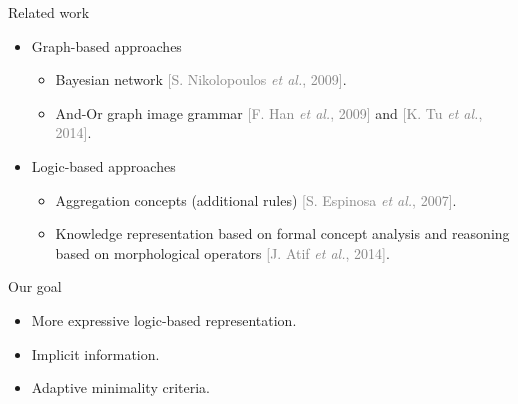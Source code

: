 \documentclass{beamer}
\begin{document}
\begin{frame}{Related work}

 \begin{itemize}
  \item Graph-based approaches
  \begin{itemize}
   \item Bayesian network \textcolor{gray}{[S. Nikolopoulos \textit{et al.}, 2009]}.
   \item And-Or graph image grammar  \textcolor{gray}{[F. Han \textit{et al.}, 2009]} and \textcolor{gray}{[K. Tu \textit{et al.}, 2014]}.
  \end{itemize}
  \item Logic-based approaches
  \begin{itemize}
   \item Aggregation concepts (additional rules) \textcolor{gray}{[S. Espinosa \textit{et al.}, 2007]}.
   \item Knowledge representation based on formal concept analysis and reasoning based on morphological operators \textcolor{gray}{[J. Atif \textit{et al.}, 2014]}.
  \end{itemize}
 \end{itemize}
 
 \begin{alertblock}{Our goal}
   \begin{itemize}
    \item More expressive logic-based representation.
    \item Implicit information.
    \item Adaptive minimality criteria.
   \end{itemize}
 \end{alertblock}
\end{frame}
\end{document}
